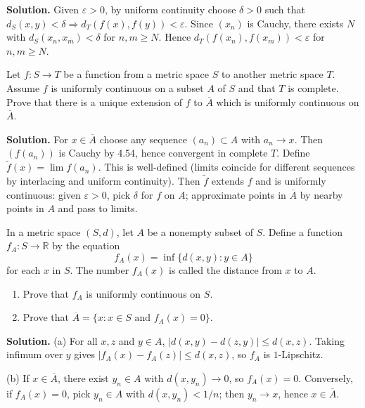 \noindent\textbf{Solution.}
Given $\varepsilon>0$, by uniform continuity choose $\delta>0$ such that $d_S(x,y)<\delta\Rightarrow d_T(f(x),f(y))<\varepsilon$. Since $(x_n)$ is Cauchy, there exists $N$ with $d_S(x_n,x_m)<\delta$ for $n,m\ge N$. Hence $d_T(f(x_n),f(x_m))<\varepsilon$ for $n,m\ge N$.
\medskip

\begin{problembox}
Let $f : S \to T$ be a function from a metric space $S$ to another metric space $T$. Assume $f$ is uniformly continuous on a subset $A$ of $S$ and that $T$ is complete. Prove that there is a unique extension of $f$ to $\overline{A}$ which is uniformly continuous on $\overline{A}$.
\end{problembox}

\noindent\textbf{Solution.}
For $x\in\overline{A}$ choose any sequence $(a_n)\subset A$ with $a_n\to x$. Then $(f(a_n))$ is Cauchy by 4.54, hence convergent in complete $T$. Define $\tilde f(x)=\lim f(a_n)$. This is well-defined (limits coincide for different sequences by interlacing and uniform continuity). Then $\tilde f$ extends $f$ and is uniformly continuous: given $\varepsilon>0$, pick $\delta$ for $f$ on $A$; approximate points in $\overline{A}$ by nearby points in $A$ and pass to limits.
\medskip

\begin{problembox}
In a metric space $(S, d)$, let $A$ be a nonempty subset of $S$. Define a function $f_A : S \to \mathbb{R}$ by the equation
\[f_A(x) = \inf \{d(x, y) : y \in A\}\]
for each $x$ in $S$. The number $f_A(x)$ is called the distance from $x$ to $A$.
\begin{enumerate}[label=(\alph*)]
\item Prove that $f_A$ is uniformly continuous on $S$.
\item Prove that $\overline{A} = \{x : x \in S \text{ and } f_A(x) = 0\}$.
\end{enumerate}
\end{problembox}

\noindent\textbf{Solution.}
(a) For all $x,z$ and $y\in A$, $|d(x,y)-d(z,y)|\le d(x,z)$. Taking infimum over $y$ gives $|f_A(x)-f_A(z)|\le d(x,z)$, so $f_A$ is $1$-Lipschitz.

(b) If $x\in\overline{A}$, there exist $y_n\in A$ with $d(x,y_n)\to 0$, so $f_A(x)=0$. Conversely, if $f_A(x)=0$, pick $y_n\in A$ with $d(x,y_n)<1/n$; then $y_n\to x$, hence $x\in\overline{A}$.
\medskip

